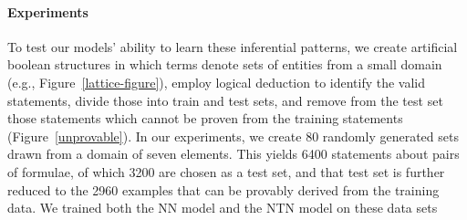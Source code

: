 
\paragraph{Experiments}
To test our models' ability to learn these inferential patterns, we
create artificial boolean structures in which terms denote sets of entities from
a small domain (e.g., Figure~\ref{lattice-figure}), employ logical
deduction to identify the valid statements, divide those into train
and test sets, and remove from the test set those statements which
cannot be proven from the training statements
(Figure~\ref{unprovable}).
%
%
%
In our experiments, we create 80 randomly generated sets drawn from a
domain of seven elements. This yields 6400 statements about pairs of
formulae, of which 3200 are chosen as a test set, and that test set is
further reduced to the 2960 examples that can be provably derived from
the training data. We trained both the NN model and the NTN model on
these data
sets%

